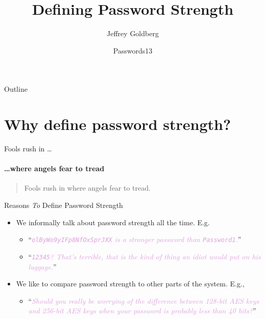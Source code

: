 \documentclass[xcolor={dvipsnames,table}]{beamer}
\title{Defining Password Strength}
\author{Jeffrey Goldberg}
\institute[AgileBits] %
{%
  Chief Defender Against the Dark Arts\\
  AgileBits Inc.\\
  \texttt{jeff@agilebits.com}}
\date[Password13]{Passwords13}
\newcommand\pwd[1]{\texttt{#1}}
\newcommand\tquote[1]{``\textit{\textcolor{Plum}{#1}}''}
\begin{document}
\begin{frame}
  \titlepage
\end{frame}

\begin{frame}{Outline}
  \tableofcontents
\end{frame}

\section{Why define password strength?}


\begin{frame}{Fools rush in \dots }
\framesubtitle{\dots where angels fear to tread}
\begin{quote}
Fools rush in where angels fear to tread.
\end{quote}
\end{frame}

\begin{frame}{Reasons \emph{To} Define Password Strength}

  \begin{itemize}
  \item We informally talk about password strength all the time. E.g.
    \begin{itemize}
    \pause
    \item \tquote{\pwd{olByWo9yIFp8NfOxSprJXX} is a stronger password than  \pwd{Password1}.}
    \pause
    \item \tquote{\pwd{12345}? That's terrible, that is the kind of thing an idiot would put on his luggage.}
    \end{itemize}
  \pause
  \item We like to compare password strength to other parts of the system. E.g.,
    \begin{itemize}
    \pause
    \item \tquote{Should you really be worrying of the difference between 128-bit AES keys and 256-bit AES keys when your password is probably less than 40 bits?}
    \end{itemize}
   \end{itemize}
\end{frame}
\end{document}
